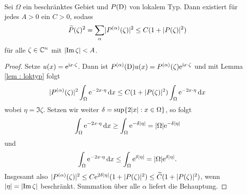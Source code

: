 \begin{lem}
Sei $\Omega$ ein beschränktes Gebiet und $P(\mathrm D)$ von lokalem Typ. Dann existiert für jedes $A>0$ ein $C>0$, sodass
\begin{equation}
\widetilde{P}(\zeta)^2=\sum_\alpha \lvert P^{(\alpha)}(\zeta)\rvert^2\leq C(1+\lvert P(\zeta)\rvert^2)
\end{equation}
für alle $\zeta\in\mathbb C^n$ mit $\lvert\operatorname{Im} \zeta\rvert < A$.
\end{lem}
\begin{proof}
Setze $u(x)=\mathrm e^{\mathrm i x\cdot\zeta}$. Dann ist $P^{(\alpha)}(\mathrm D)u(x)=P^{(\alpha)}(\zeta)\mathrm e^{\mathrm i x\cdot\zeta}$ und mit Lemma \ref{lem : loktyp} folgt
\begin{equation}
\lvert P^{(\alpha)}(\zeta)\rvert^2 \int_{\Omega} \mathrm e^{-2x\cdot \eta}\,\mathrm d x \leq C(1+\lvert P(\zeta)\rvert^2)\int_\Omega \mathrm e^{-2x\cdot \eta}\,\mathrm d x
\end{equation}
wobei $\eta = \Im \zeta$. Setzen wir weiter $\delta = \sup \{2\lvert x\rvert:x\in\Omega\}$, so folgt
\begin{equation}
\int_\Omega \mathrm e^{-2x\cdot \eta}\,\mathrm d x \geq \int_\Omega \mathrm e^{-\delta \lvert\eta\rvert}=\lvert\Omega\rvert\mathrm e^{-\delta \lvert\eta\rvert}
\end{equation}
und
\begin{equation}
\int_\Omega \mathrm e^{-2x\cdot \eta}\,\mathrm d x \leq \int_\Omega \mathrm e^{\delta \lvert\eta\rvert}=\lvert\Omega\rvert\mathrm e^{\delta \lvert\eta\rvert}.
\end{equation}
Insgesamt also $\lvert P^{(\alpha)}(\zeta)\rvert^2\leq C\mathrm e^{2\delta \lvert\eta\rvert}(1+\lvert P(\zeta)\rvert^2)\leq \widetilde{C}(1+\lvert P(\zeta)\rvert^2) $, wenn $\lvert\eta\rvert=\lvert\operatorname{Im} \zeta\rvert$ beschränkt. Summation über alle $\alpha$ liefert die Behauptung.
\end{proof}


%
%

